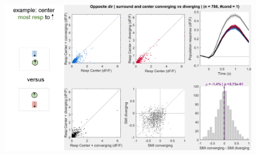 \begin{figure}[H] \centering \includegraphics[width=11cm,height=11cm,keepaspectratio]{Figures/7.Results/population/sel/diagrams/21.png} 
\end{figure}

% 
%    
%           
%
%        

